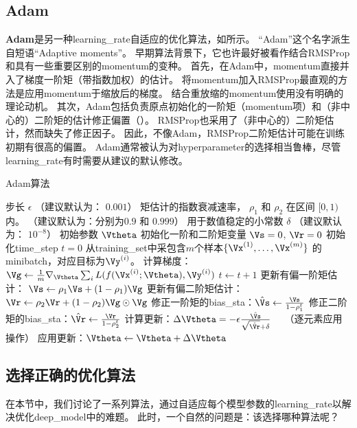 \subsection{Adam}
\label{sec:adam}
\textbf{Adam}\citep{kingma2014adam}是另一种\gls{learning_rate}自适应的优化算法，如所示。
``Adam''这个名字派生自短语``Adaptive moments''。
早期算法背景下，它也许最好被看作结合RMSProp和具有一些重要区别的\gls{momentum}的变种。
首先，在Adam中，\gls{momentum}直接并入了梯度一阶矩（带指数加权）的估计。
将\gls{momentum}加入RMSProp最直观的方法是应用\gls{momentum}于缩放后的梯度。
结合重放缩的\gls{momentum}使用没有明确的理论动机。
其次，Adam包括负责原点初始化的一阶矩（\gls{momentum}项）和（非中心的）二阶矩的估计修正偏置（）。
RMSProp也采用了（非中心的）二阶矩估计，然而缺失了修正因子。
因此，不像Adam，RMSProp二阶矩估计可能在训练初期有很高的偏置。
Adam通常被认为对\gls{hyperparameter}的选择相当鲁棒，尽管\gls{learning_rate}有时需要从建议的默认修改。

\begin{algorithm}[ht]
\caption{Adam算法}
\label{alg:adam}
\begin{algorithmic}
\REQUIRE 步长 $\epsilon$ （建议默认为： $0.001$）
\REQUIRE 矩估计的指数衰减速率， $\rho_1$ 和 $\rho_2$ 在区间 $[0, 1)$内。
（建议默认为：分别为$0.9$ 和 $0.999$）
\REQUIRE 用于数值稳定的小常数 $\delta$  （建议默认为： $10^{-8}$）
\REQUIRE 初始参数 $\Vtheta$
\STATE 初始化一阶和二阶矩变量 $\Vs = 0 $, $\Vr = 0$
\STATE 初始化\gls{time_step} $t=0$ 
    \STATE 从\gls{training_set}中采包含$m$个样本$\{ \Vx^{(1)},\dots, \Vx^{(m)}\}$ 的\gls{minibatch}，对应目标为$\Vy^{(i)}$。
    \STATE 计算梯度：$\Vg \leftarrow \frac{1}{m} \nabla_{\Vtheta} \sum_i L(f(\Vx^{(i)};\Vtheta),\Vy^{(i)})$ 
    \STATE $t \leftarrow t + 1$
    \STATE 更新有偏一阶矩估计： $\Vs \leftarrow \rho_1 \Vs + (1-\rho_1) \Vg$
    \STATE 更新有偏二阶矩估计：$\Vr \leftarrow \rho_2 \Vr + (1-\rho_2) \Vg \odot \Vg$
    \STATE 修正一阶矩的\gls{bias_sta}：$\hat{\Vs} \leftarrow \frac{\Vs}{1-\rho_1^t}$
    \STATE 修正二阶矩的\gls{bias_sta}：$\hat{\Vr} \leftarrow \frac{\Vr}{1-\rho_2^t}$
    \STATE 计算更新：$\Delta \Vtheta = - \epsilon \frac{\hat{\Vs}}{\sqrt{\hat{\Vr}} + \delta}$ \ \  （逐元素应用操作）
    \STATE 应用更新：$\Vtheta \leftarrow \Vtheta + \Delta \Vtheta$
\ENDWHILE
\end{algorithmic}
\end{algorithm}



\subsection{选择正确的优化算法}
\label{sec:choosing_the_right_optimization_algorithms}
在本节中，我们讨论了一系列算法，通过自适应每个模型参数的\gls{learning_rate}以解决优化\gls{deep_model}中的难题。
此时，一个自然的问题是：该选择哪种算法呢？

